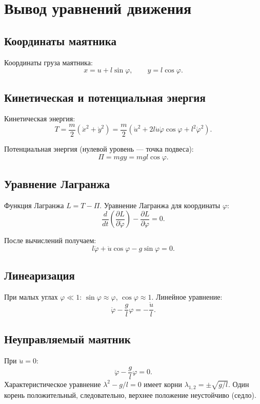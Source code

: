\section{Вывод уравнений движения}

\subsection{Координаты маятника}
Координаты груза маятника:
\[
x = u + l\sin\varphi, \qquad y = l\cos\varphi.
\]

\subsection{Кинетическая и потенциальная энергия}
Кинетическая энергия:
\[
T = \frac{m}{2}(\dot{x}^2 + \dot{y}^2) = \frac{m}{2}\left(\dot{u}^2 + 2l\dot{u}\dot{\varphi}\cos\varphi + l^2\dot{\varphi}^2\right).
\]

Потенциальная энергия (нулевой уровень — точка подвеса):
\[
\Pi = mgy = mgl\cos\varphi.
\]

\subsection{Уравнение Лагранжа}
Функция Лагранжа \(L = T - \Pi\). Уравнение Лагранжа для координаты \(\varphi\):
\[
\frac{d}{dt}\left(\frac{\partial L}{\partial \dot{\varphi}}\right) - \frac{\partial L}{\partial \varphi} = 0.
\]

После вычислений получаем:
\[
l\ddot{\varphi} + \ddot{u}\cos\varphi - g\sin\varphi = 0.
\]

\subsection{Линеаризация}
При малых углах \(\varphi \ll 1\): \(\sin\varphi \approx \varphi\), \(\cos\varphi \approx 1\). Линейное уравнение:
\[
\ddot{\varphi} - \frac{g}{l}\varphi = -\frac{\ddot{u}}{l}. \tag{1}
\]

\subsection{Неуправляемый маятник}
При \(\ddot{u} = 0\):
\[
\ddot{\varphi} - \frac{g}{l}\varphi = 0.
\]
Характеристическое уравнение \(\lambda^2 - g/l = 0\) имеет корни \(\lambda_{1,2} = \pm\sqrt{g/l}\). Один корень положительный, следовательно, верхнее положение неустойчиво (седло).